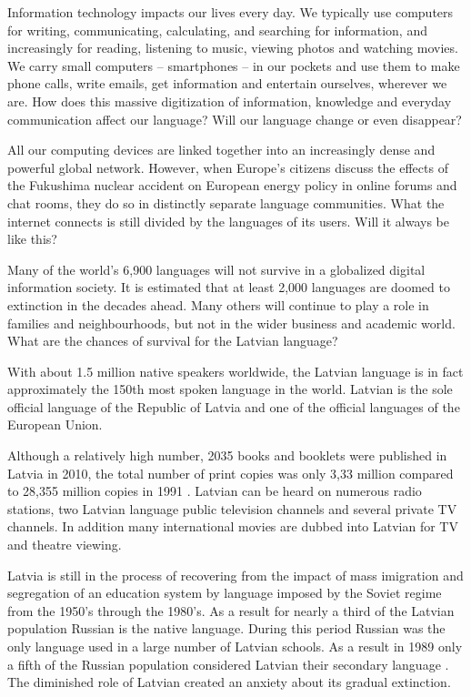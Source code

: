 \begin{multicols}{2}

Information technology impacts our lives every day.
We typically use computers for writing, communicating, calculating, and searching for information, and increasingly for reading, listening to music, viewing photos and watching movies.
We carry small computers – smartphones – in our pockets and use them to make phone calls, write emails, get information and entertain ourselves, wherever we are.
How does this massive digitization of information, knowledge and everyday communication affect our language?
Will our language change or even disappear? 

All our computing devices are linked together into an increasingly dense and powerful global network.
However, when Europe's citizens discuss the effects of the Fukushima nuclear accident on European energy policy in online forums and chat rooms, they do so in distinctly separate language communities.
What the internet connects is still divided by the languages of its users.
Will it always be like this? 

Many of the world’s 6,900 languages will not survive in a globalized digital information society.
It is estimated that at least 2,000 languages are doomed to extinction in the decades ahead.
Many others will continue to play a role in families and neighbourhoods, but not in the wider business and academic world.
What are the chances of survival for the Latvian language? 

With about 1.5 million native speakers worldwide, the Latvian language is in fact approximately the 150th most spoken language in the world.
Latvian is the sole official language of the Republic of Latvia and one of the official languages of the European Union.
  
Although a relatively high number, 2035 books and booklets were published in Latvia in 2010, the total number of print copies was only 3,33 million compared to 28,355 million copies in 1991 \cite{Meta1ES}.
Latvian can be heard on numerous radio stations, two Latvian language public television channels and several private TV channels.
In addition many international movies are dubbed into Latvian for TV and theatre viewing. 

Latvia is still in the process of recovering from the impact of mass imigration and segregation of an education system by language imposed by the Soviet regime from the 1950’s through the 1980’s.
As a result for nearly a third of the Latvian population Russian is the native language.
During this period Russian was the only language used in a large number of Latvian schools.
As a result in 1989 only a fifth of the Russian population considered Latvian their secondary language \cite{Meta2ES}.
The diminished role of Latvian created an anxiety about its gradual extinction.


\end{multicols}
